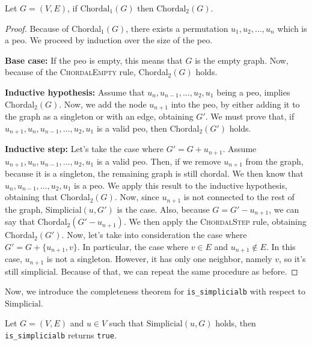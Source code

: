 \begin{lemma}\label{lem:chordal12}
    Let $G = (V, E)$, if $\mathrm{Chordal}_1(G)$ then $\mathrm{Chordal}_2(G)$.
\end{lemma}

\begin{proof}
    Because of Chordal$_1(G)$, there exists a permutation $u_1, u_2, \dots, u_n$ which is a \gls{peo}. We proceed by induction over the size of the \gls{peo}.

    \medskip

    \textbf{Base case:}
    If the \gls{peo} is empty, this means that $G$ is the empty graph. Now, because of the \textsc{ChordalEmpty} rule, Chordal$_2(G)$ holds.

    \medskip

    \textbf{Inductive hypothesis:}
    Assume that $u_n, u_{n-1}, \dots, u_2, u_1$ being a \gls{peo}, implies Chordal$_2(G)$. Now, we add the node $u_{n+1}$ into the \gls{peo}, by either adding it to the graph as a singleton or with an edge, obtaining $G'$. We must prove that, if $u_{n+1}, u_n, u_{n-1}, \dots, u_2, u_1$ is a valid \gls{peo}, then Chordal$_2(G')$ holds.

    \medskip

    \textbf{Inductive step:}
    Let's take the case where $G' = G + u_{n+1}$. Assume $u_{n+1}, u_{n}, u_{n-1}, \dots, u_2, u_1$ is a valid \gls{peo}. Then, if we remove $u_{n+1}$ from the graph, because it is a singleton, the remaining graph is still chordal. We then know that $u_n, u_{n-1}, \dots, u_2, u_1$ is a \gls{peo}. We apply this result to the inductive hypothesis, obtaining that Chordal$_2(G)$. Now, since $u_{n+1}$ is not connected to the rest of the graph, Simplicial$(u, G')$ is the case. Also, because $G = G' - u_{n+1}$, we can say that Chordal$_2(G' - u_{n+1})$. We then apply the \textsc{ChordalStep} rule, obtaining Chordal$_2(G')$.
    Now, let's take into consideration the case where $G' = G + \{ u_{n+1}, v \}$. In particular, the case where $v \in E$ and $u_{n+1} \not \in E$. In this case, $u_{n+1}$ is not a singleton. However, it has only one neighbor, namely $v$, so it's still simplicial. Because of that, we can repeat the same procedure as before.
\end{proof}

Now, we introduce the completeness theorem for \texttt{is\_simplicialb} with respect to $\mathrm{Simplicial}$.

\begin{lemma}\label{lem:sbcomp}
Let $G = (V, E)$ and $u \in V$ such that $\mathrm{Simplicial}(u, G)$ holds, then \texttt{is\_simplicialb} returns \texttt{true}.
\end{lemma}

